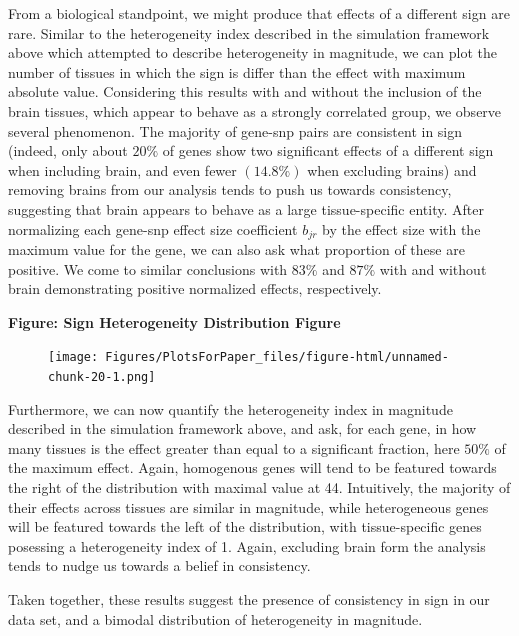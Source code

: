  From a biological standpoint, we might produce that effects of a different sign are rare. Similar to the heterogeneity index described in the simulation framework above which attempted to describe heterogeneity in magnitude, we can plot the number of tissues in which the sign is differ than the effect with maximum absolute value. Considering this results with and without the inclusion of the brain tissues, which appear to behave as a strongly correlated group, we observe several phenomenon. The majority of gene-snp pairs are consistent in sign (indeed, only about $20\%$ of genes show two significant effects of a different sign when including brain, and even fewer $(14.8\%)$ when excluding brains) and removing brains from our analysis tends to push us towards consistency, suggesting that brain appears to behave as a large tissue-specific entity. After normalizing each gene-snp effect size coefficient $b_{jr}$ by the effect size with the maximum value for the gene, we can also ask what proportion of these are positive. We come to similar conclusions with $83\%$ and $87\%$ with and without brain demonstrating positive normalized effects, respectively. \newline


\textbf{Figure: Sign Heterogeneity Distribution Figure}
\newline
\begin{figure}[htbp]
\texttt{[image: Figures/PlotsForPaper\_files/figure-html/unnamed-chunk-20-1.png]}\\
\end{figure}\newline

Furthermore, we can now quantify the heterogeneity index in magnitude described in the simulation framework above, and ask, for each gene, in how many tissues is the effect greater than equal to a significant fraction, here $50\%$ of the maximum effect. Again, homogenous genes will tend to be featured towards the right of the distribution with maximal value at 44. Intuitively, the majority of their effects across tissues are similar in magnitude, while heterogeneous genes will be featured towards the left of the distribution, with tissue-specific genes posessing a heterogeneity index of 1. Again, excluding brain form the analysis tends to nudge us towards a belief in consistency. 

Taken together, these results suggest the presence of consistency in sign in our data set, and a bimodal distribution of heterogeneity in magnitude.

